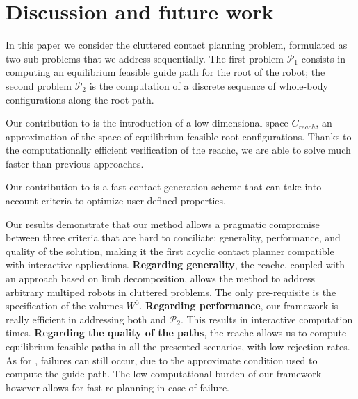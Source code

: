  \section{Discussion and future work} 
\label{sec:conclusion}

In this paper we consider the \gls{cluttered} contact planning problem, formulated as two sub-problems that we address sequentially.
The first problem $\mathcal{P}_1$ consists in computing an \gls{equilibrium feasible} guide path for the root of the robot;
 the second problem $\mathcal{P}_2$ is the computation of a discrete sequence of whole-body configurations along the root path.

Our contribution to \Pa is the introduction of a low-dimensional space $C_{reach}$, an approximation of the space of \gls{equilibrium feasible} root configurations.
Thanks to the computationally efficient verification of the \gls{reachc}, we are able to solve \Pa much faster than previous approaches.

Our contribution to \Pb is a fast contact generation scheme that can take into
account criteria to optimize user-defined properties.

Our results demonstrate that our method allows a pragmatic compromise between three 
criteria that are hard to conciliate: generality, performance, and quality of the solution, making it the first acyclic contact
planner compatible with \gls{interactive} applications.
%
\textbf{Regarding generality}, the \gls{reachc}, coupled with an approach based on limb decomposition, 
allows the method to address arbitrary multiped robots in \gls{cluttered} problems. The only pre-requisite is the specification 
of the volumes $W^0$.
%
\textbf{Regarding performance}, our framework is really efficient in addressing both \Pa and $\mathcal{P}_2$. This results in \gls{interactive} computation times.
%
\textbf{Regarding the quality of the paths}, the \gls{reachc} allows us to compute
\gls{equilibrium feasible} paths in all the presented scenarios, with low rejection rates.
As for \cite{Bouyarmane2009}, failures can still occur, due to the approximate condition used to compute the guide path.
The low computational burden of our framework however allows for fast re-planning in case of failure.



